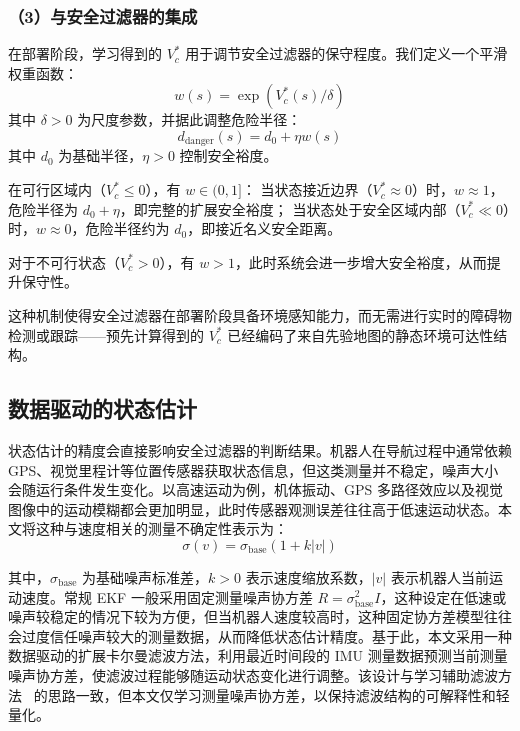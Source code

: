 \subsubsection{（3）与安全过滤器的集成}
在部署阶段，学习得到的 $V^*_c$ 用于调节安全过滤器的保守程度。我们定义一个平滑权重函数：
\begin{equation}
    w(s) = \exp(V^*_c(s) / \delta)
\end{equation}
其中 $\delta > 0$ 为尺度参数，并据此调整危险半径：
\begin{equation}
d_{\text{danger}}(s) = d_0 + \eta  w(s)
\label{eq:danger_radius}
\end{equation}
其中 $d_0$ 为基础半径，$\eta > 0$ 控制安全裕度。

在可行区域内（$V^*_c \leq 0$），有 $w \in (0,1]$：
当状态接近边界（$V^*_c \approx 0$）时，$w \approx 1$，危险半径为 $d_0 + \eta$，即完整的扩展安全裕度；
当状态处于安全区域内部（$V^*_c \ll 0$）时，$w \approx 0$，危险半径约为 $d_0$，即接近名义安全距离。

对于不可行状态（$V^*_c > 0$），有 $w > 1$，此时系统会进一步增大安全裕度，从而提升保守性。

这种机制使得安全过滤器在部署阶段具备环境感知能力，而无需进行实时的障碍物检测或跟踪——预先计算得到的 $V^*_c$ 已经编码了来自先验地图的静态环境可达性结构。

\subsection{数据驱动的状态估计}
状态估计的精度会直接影响安全过滤器的判断结果。机器人在导航过程中通常依赖 GPS、视觉里程计等位置传感器获取状态信息，但这类测量并不稳定，噪声大小会随运行条件发生变化。以高速运动为例，机体振动、GPS 多路径效应以及视觉图像中的运动模糊都会更加明显，此时传感器观测误差往往高于低速运动状态。本文将这种与速度相关的测量不确定性表示为：
\begin{equation}
\sigma(v) = \sigma_{\text{base}}(1 + k |v|)
\label{eq:vel_noise}
\end{equation}

其中，$\sigma_{\text{base}}$ 为基础噪声标准差，$k > 0$ 表示速度缩放系数，$|v|$ 表示机器人当前运动速度。常规 EKF 一般采用固定测量噪声协方差 $R = \sigma_{\text{base}}^2 I$，这种设定在低速或噪声较稳定的情况下较为方便，但当机器人速度较高时，这种固定协方差模型往往会过度信任噪声较大的测量数据，从而降低状态估计精度。基于此，本文采用一种数据驱动的扩展卡尔曼滤波方法，利用最近时间段的 IMU 测量数据预测当前测量噪声协方差，使滤波过程能够随运动状态变化进行调整。该设计与学习辅助滤波方法~\cite{revach2022kalmannet,buchanan2023learning_ekf,cohen2025akit} 的思路一致，但本文仅学习测量噪声协方差，以保持滤波结构的可解释性和轻量化。

